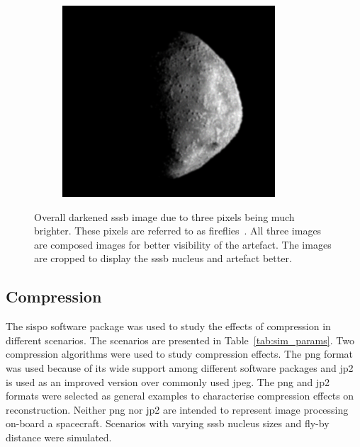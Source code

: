 \begin{figure}[htb]
\begin{subfigure}[b]{0.32\textwidth}
            \label{fig:render_dark_2}
        \end{subfigure}
        \begin{subfigure}[b]{0.32\textwidth}
            \centering
            \includegraphics[width=\textwidth]{doc/thesis/0_figures/composition_darkening/Inst_2017-08-15T115819-007000_center.png}
            \label{fig:render_dark_3}
        \end{subfigure}
    \caption{Overall darkened \gls{sssb} image due to three pixels being much brighter. These pixels are referred to as fireflies~\cite{Valenza2015BlenderCookbook}. All three images are composed images for better visibility of the artefact. The images are cropped to display the \gls{sssb} nucleus and artefact better.}
    \label{fig:render_dark}
\end{figure}

\clearpage

\subsection{Compression} \label{sec:results_comp}
The \gls{sispo} software package was used to study the effects of compression in different scenarios. The scenarios are presented in Table~\ref{tab:sim_params}. Two compression algorithms were used to study compression effects. The \gls{png} format was used because of its wide support among different software packages and \gls{jp2} is used as an improved version over commonly used \gls{jpeg}. The \gls{png} and \gls{jp2} formats were selected as general examples to characterise compression effects on reconstruction. Neither \gls{png} nor \gls{jp2} are intended to represent image processing on-board a spacecraft. Scenarios with varying \gls{sssb} nucleus sizes and fly-by distance were simulated. 

